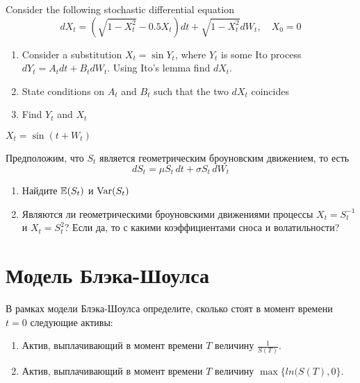 \begin{problem}
Consider the following stochastic differential equation
\begin{equation}
dX_t=(\sqrt{1-X_t^2}-0.5X_t)dt+\sqrt{1-X_t^2}dW_t, \quad X_0=0
\end{equation}
\begin{enumerate}
\item Consider a substitution $X_t=\sin Y_t$, where $Y_t$ is some Ito process $dY_t=A_tdt+B_tdW_t$. Using Ito's lemma find $dX_t$.
\item State conditions on $A_t$ and $B_t$ such that the two $dX_t$ coincides
\item Find $Y_t$ and $X_t$
\end{enumerate}

\begin{sol}
$X_t=\sin(t+W_t)$
\end{sol}
\end{problem}


\begin{problem}
Предположим, что $S_t$ является геометрическим броуновским движением, то есть
\[
dS_t = \mu S_t \, dt + \sigma S_t \, dW_t
\]


\begin{enumerate}
\item Найдите $\mathbb{E}(S_t)$ и $\operatorname{Var}(S_t)$
\item Являются ли геометрическими броуновскими движениями процессы $X_t=S_t^{-1}$ и $X_t=S_t^{2}$? Если да, то с какими коэффициентами сноса и волатильности?
\end{enumerate}


\begin{sol}

\end{sol}
\end{problem}


\section{Модель Блэка-Шоулса}


\begin{problem}
В рамках модели Блэка-Шоулса определите, сколько стоят в момент времени $t=0$ следующие активы:
\begin{enumerate}
\item Актив, выплачивающий в момент времени $T$ величину $\frac{1}{S(T)}$.
\item Актив, выплачивающий в момент времени $T$ величину $\max\{ln(S(T),0\}$.
\end{enumerate}

\begin{sol}

\end{sol}
\end{problem}


